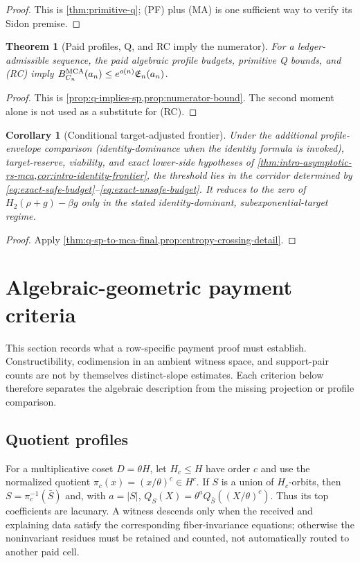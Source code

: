 \documentclass[12pt,a4paper]{amsart}
\numberwithin{equation}{section}
\newtheorem{theorem}{Theorem}[section]
\newtheorem{corollary}[corollary]{Corollary}
\theoremstyle{remark}
\newcommand{\Hb}{H_2}
\newcommand{\abs}[1]{\lvert #1\rvert}
\begin{document}
\begin{proof}
This is \cref{thm:primitive-q}; \textup{(PF)} plus \textup{(MA)} is one
sufficient way to verify its Sidon premise.
\end{proof}

\begin{theorem}[Paid profiles, Q, and RC imply the numerator]\label{thm:q-sp-to-mca-final}
For a ledger-admissible sequence, the paid algebraic profile budgets,
primitive Q bounds, and \textup{(RC)} imply
\(B_{C_n}^{\rm MCA}(a_n)\le e^{o(n)}\mathfrak E_n(a_n)\).
\end{theorem}

\begin{proof}
This is \cref{prop:q-implies-sp,prop:numerator-bound}.  The second moment
alone is not used as a substitute for \textup{(RC)}.
\end{proof}

\begin{corollary}[Conditional target-adjusted frontier]\label{cor:frontier-final}
Under the additional profile-envelope comparison (identity-dominance when
the identity formula is invoked), target-reserve, viability, and
exact lower-side hypotheses of
\cref{thm:intro-asymptotic-rs-mca,cor:intro-identity-frontier}, the threshold
lies in the corridor determined by
\eqref{eq:exact-safe-budget}--\eqref{eq:exact-unsafe-budget}.  It reduces to
the zero of \(\Hb(\rho+g)-\beta g\) only in the stated identity-dominant,
subexponential-target regime.
\end{corollary}

\begin{proof}
Apply \cref{thm:q-sp-to-mca-final,prop:entropy-crossing-detail}.
\end{proof}


\section{Algebraic-geometric payment criteria}\label{sec:expanded-ledger-proofs}

This section records what a row-specific payment proof must establish.
Constructibility, codimension in an ambient witness space, and support-pair
counts are not by themselves distinct-slope estimates.  Each criterion
below therefore separates the algebraic description from the missing
projection or profile comparison.

\subsection*{Quotient profiles}
For a multiplicative coset \(D=\theta H\), let \(H_c\le H\) have order
\(c\) and use the normalized quotient
\(\pi_c(x)=(x/\theta)^c\in H^c\).  If \(S\) is a union of \(H_c\)-orbits,
then \(S=\pi_c^{-1}(\bar S)\) and, with \(a=\abs S\),
\(Q_S(X)=\theta^aQ_{\bar S}((X/\theta)^c)\).  Thus its top coefficients
are lacunary.  A witness descends only when the received and explaining
data satisfy the corresponding fiber-invariance equations; otherwise the
noninvariant residues must be retained and counted, not automatically
routed to another paid cell.
\end{document}
